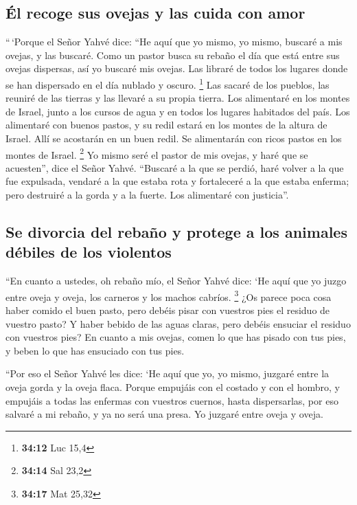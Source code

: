\begin{paracol}{2}
\hypertarget{uxe9l-recoge-sus-ovejas-y-las-cuida-con-amor}{%
\subsection{Él recoge sus ovejas y las cuida con
amor}\label{uxe9l-recoge-sus-ovejas-y-las-cuida-con-amor}}

 ``\,`Porque el Señor Yahvé dice: ``He aquí que yo mismo,
yo mismo, buscaré a mis ovejas, y las buscaré.  Como un
pastor busca su rebaño el día que está entre sus ovejas dispersas, así
yo buscaré mis ovejas. Las libraré de todos los lugares donde se han
dispersado en el día nublado y oscuro. \footnote{\textbf{34:12} Luc 15,4}
 Las sacaré de los pueblos, las reuniré de las tierras y
las llevaré a su propia tierra. Los alimentaré en los montes de Israel,
junto a los cursos de agua y en todos los lugares habitados del país.
 Los alimentaré con buenos pastos, y su redil estará en
los montes de la altura de Israel. Allí se acostarán en un buen redil.
Se alimentarán con ricos pastos en los montes de Israel. \footnote{\textbf{34:14}
  Sal 23,2}  Yo mismo seré el pastor de mis ovejas, y
haré que se acuesten'', dice el Señor Yahvé.  ``Buscaré a
la que se perdió, haré volver a la que fue expulsada, vendaré a la que
estaba rota y fortaleceré a la que estaba enferma; pero destruiré a la
gorda y a la fuerte. Los alimentaré con justicia''.

\hypertarget{se-divorcia-del-rebauxf1o-y-protege-a-los-animales-duxe9biles-de-los-violentos}{%
\subsection{Se divorcia del rebaño y protege a los animales débiles de
los
violentos}\label{se-divorcia-del-rebauxf1o-y-protege-a-los-animales-duxe9biles-de-los-violentos}}

 ``En cuanto a ustedes, oh rebaño mío, el Señor Yahvé
dice: `He aquí que yo juzgo entre oveja y oveja, los carneros y los
machos cabríos. \footnote{\textbf{34:17} Mat 25,32}  ¿Os
parece poca cosa haber comido el buen pasto, pero debéis pisar con
vuestros pies el residuo de vuestro pasto? Y haber bebido de las aguas
claras, pero debéis ensuciar el residuo con vuestros pies?
 En cuanto a mis ovejas, comen lo que has pisado con tus
pies, y beben lo que has ensuciado con tus pies.

 ``Por eso el Señor Yahvé les dice: `He aquí que yo, yo
mismo, juzgaré entre la oveja gorda y la oveja flaca. 
Porque empujáis con el costado y con el hombro, y empujáis a todas las
enfermas con vuestros cuernos, hasta dispersarlas,  por
eso salvaré a mi rebaño, y ya no será una presa. Yo juzgaré entre oveja
y oveja.


\end{paracol}

